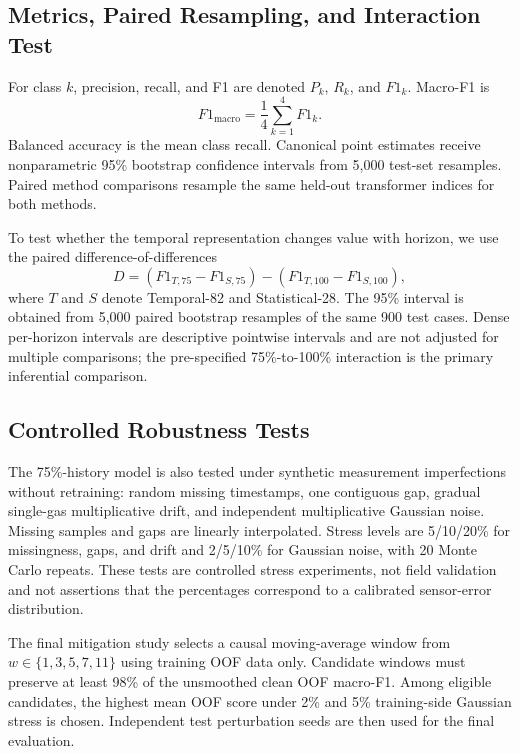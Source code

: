 \documentclass[conference]{IEEEtran}
\begin{document}
\subsection{Metrics, Paired Resampling, and Interaction Test}
For class $k$, precision, recall, and F1 are denoted $P_k$, $R_k$, and $F1_k$. Macro-F1 is
\begin{equation}
F1_{\mathrm{macro}}=\frac{1}{4}\sum_{k=1}^{4}F1_k.
\label{eq:macrof1}
\end{equation}
Balanced accuracy is the mean class recall. Canonical point estimates receive nonparametric 95\% bootstrap confidence intervals from 5,000 test-set resamples. Paired method comparisons resample the same held-out transformer indices for both methods.

To test whether the temporal representation changes value with horizon, we use the paired difference-of-differences
\begin{equation}
D=\left(F1_{T,75}-F1_{S,75}\right)-\left(F1_{T,100}-F1_{S,100}\right),
\label{eq:interaction}
\end{equation}
where $T$ and $S$ denote Temporal-82 and Statistical-28. The 95\% interval is obtained from 5,000 paired bootstrap resamples of the same 900 test cases. Dense per-horizon intervals are descriptive pointwise intervals and are not adjusted for multiple comparisons; the pre-specified 75\%-to-100\% interaction is the primary inferential comparison.

\subsection{Controlled Robustness Tests}
The 75\%-history model is also tested under synthetic measurement imperfections without retraining: random missing timestamps, one contiguous gap, gradual single-gas multiplicative drift, and independent multiplicative Gaussian noise. Missing samples and gaps are linearly interpolated. Stress levels are 5/10/20\% for missingness, gaps, and drift and 2/5/10\% for Gaussian noise, with 20 Monte Carlo repeats. These tests are controlled stress experiments, not field validation and not assertions that the percentages correspond to a calibrated sensor-error distribution.

The final mitigation study selects a causal moving-average window from $w\in\{1,3,5,7,11\}$ using training OOF data only. Candidate windows must preserve at least 98\% of the unsmoothed clean OOF macro-F1. Among eligible candidates, the highest mean OOF score under 2\% and 5\% training-side Gaussian stress is chosen. Independent test perturbation seeds are then used for the final evaluation.
\end{document}
